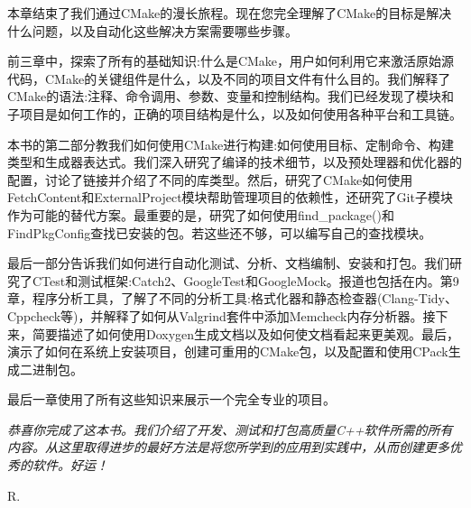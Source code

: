 本章结束了我们通过CMake的漫长旅程。现在您完全理解了CMake的目标是解决什么问题，以及自动化这些解决方案需要哪些步骤。

前三章中，探索了所有的基础知识:什么是CMake，用户如何利用它来激活原始源代码，CMake的关键组件是什么，以及不同的项目文件有什么目的。我们解释了CMake的语法:注释、命令调用、参数、变量和控制结构。我们已经发现了模块和子项目是如何工作的，正确的项目结构是什么，以及如何使用各种平台和工具链。

本书的第二部分教我们如何使用CMake进行构建:如何使用目标、定制命令、构建类型和生成器表达式。我们深入研究了编译的技术细节，以及预处理器和优化器的配置，讨论了链接并介绍了不同的库类型。然后，研究了CMake如何使用FetchContent和ExternalProject模块帮助管理项目的依赖性，还研究了Git子模块作为可能的替代方案。最重要的是，研究了如何使用find\_package()和FindPkgConfig查找已安装的包。若这些还不够，可以编写自己的查找模块。

最后一部分告诉我们如何进行自动化测试、分析、文档编制、安装和打包。我们研究了CTest和测试框架:Catch2、GoogleTest和GoogleMock。报道也包括在内。第9章，程序分析工具，了解了不同的分析工具:格式化器和静态检查器(Clang-Tidy、Cppcheck等)，并解释了如何从Valgrind套件中添加Memcheck内存分析器。接下来，简要描述了如何使用Doxygen生成文档以及如何使文档看起来更美观。最后，演示了如何在系统上安装项目，创建可重用的CMake包，以及配置和使用CPack生成二进制包。

最后一章使用了所有这些知识来展示一个完全专业的项目。

\textit{恭喜你完成了这本书。我们介绍了开发、测试和打包高质量C++软件所需的所有内容。从这里取得进步的最好方法是将您所学到的应用到实践中，从而创建更多优秀的软件。好运！}

R.















